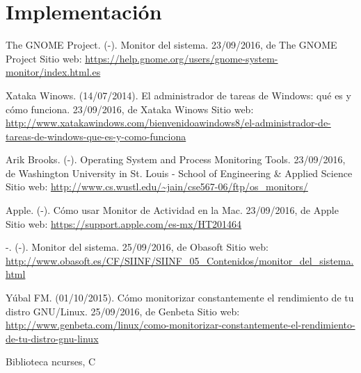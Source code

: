 \documentclass[a4paper,11pt]{article}
\begin{document}
\section{Implementación}

\begin{thebibliography}{}

  The GNOME Project.
  (-).
  Monitor del sistema.
  23/09/2016, 
  de The GNOME Project 
  Sitio web:   \url{https://help.gnome.org/users/gnome-system-monitor/index.html.es}

  Xataka Winows. 
  (14/07/2014). 
  El administrador de tareas de Windows: qué es y cómo funciona. 
  23/09/2016, de Xataka Winows 
  Sitio web: \url{http://www.xatakawindows.com/bienvenidoawindows8/el-administrador-de-tareas-de-windows-que-es-y-como-funciona}

  Arik Brooks. 
  (-). 
  Operating System and Process Monitoring Tools. 
  23/09/2016, de Washington University in St. Louis - School of Engineering \& Applied Science 
  Sitio web: \url{http://www.cs.wustl.edu/~jain/cse567-06/ftp/os_monitors/}

  Apple. 
  (-). 
  Cómo usar Monitor de Actividad en la Mac. 
  23/09/2016, de Apple 
  Sitio web: \url{https://support.apple.com/es-mx/HT201464}

  -. 
  (-). 
  Monitor del sistema. 
  25/09/2016, de Obasoft 
  Sitio web: \url{http://www.obasoft.es/CF/SIINF/SIINF_05_Contenidos/monitor_del_sistema.html}
  
  Yúbal FM. 
  (01/10/2015). 
  Cómo monitorizar constantemente el rendimiento de tu distro GNU/Linux. 
  25/09/2016, de Genbeta 
  Sitio web: \url{http://www.genbeta.com/linux/como-monitorizar-constantemente-el-rendimiento-de-tu-distro-gnu-linux}

\end{thebibliography}

Biblioteca ncurses, C
\end{document}
